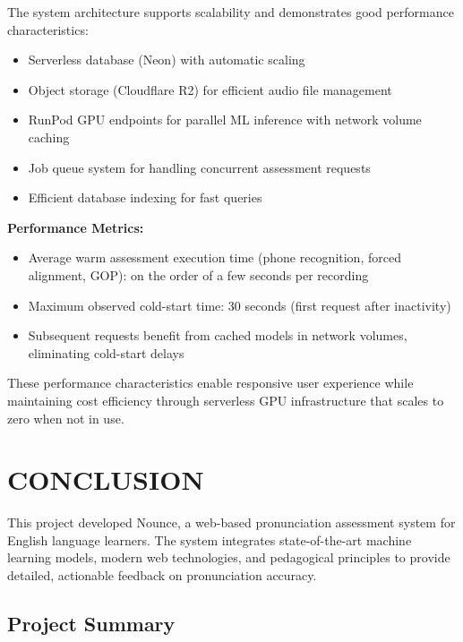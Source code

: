 \documentclass[a4paper,12pt]{report}
\begin{document}
The system architecture supports scalability and demonstrates good performance characteristics:
\begin{itemize}
    \item Serverless database (Neon) with automatic scaling
    \item Object storage (Cloudflare R2) for efficient audio file management
    \item RunPod GPU endpoints for parallel ML inference with network volume caching
    \item Job queue system for handling concurrent assessment requests
    \item Efficient database indexing for fast queries
\end{itemize}

\textbf{Performance Metrics:}
\begin{itemize}
    \item Average warm assessment execution time (phone recognition, forced alignment, GOP): on the order of a few seconds per recording
    \item Maximum observed cold-start time: 30 seconds (first request after inactivity)
    \item Subsequent requests benefit from cached models in network volumes, eliminating cold-start delays
\end{itemize}

These performance characteristics enable responsive user experience while maintaining cost efficiency through serverless GPU infrastructure that scales to zero when not in use.

\chapter{CONCLUSION}

This project developed Nounce, a web-based pronunciation assessment system for English language learners. The system integrates state-of-the-art machine learning models, modern web technologies, and pedagogical principles to provide detailed, actionable feedback on pronunciation accuracy.

\section{Project Summary}
\end{document}
